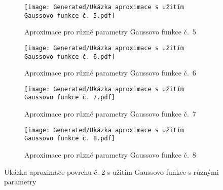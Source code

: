 \begin{landscapeimagepage}
    \vspace*{\fill}
    \begin{figure}[H]
        \centering
        \begin{subfigure}{.5\textheight}
            \centering
            \texttt{[image: Generated/Ukázka aproximace s užitím Gaussovo funkce č. 5.pdf]}
            \caption{Aproximace pro různé parametry Gaussovo funkce č.~5}
            \label{fig:Ukázka aproximace povrchu s užitím Gaussovo funkce č. 5}
        \end{subfigure}
        \vspace{0.5cm}
        \hspace{2.5cm}
        \begin{subfigure}{.5\textheight}
            \centering
            \texttt{[image: Generated/Ukázka aproximace s užitím Gaussovo funkce č. 6.pdf]}
            \caption{Aproximace pro různé parametry Gaussovo funkce č.~6}
            \label{fig:Ukázka aproximace povrchu s užitím Gaussovo funkce č. 6}
        \end{subfigure}
        \vspace{0.5cm}
        \begin{subfigure}{.5\textheight}
            \centering
            \texttt{[image: Generated/Ukázka aproximace s užitím Gaussovo funkce č. 7.pdf]}
            \caption{Aproximace pro různé parametry Gaussovo funkce č.~7}
            \label{fig:Ukázka aproximace povrchu s užitím Gaussovo funkce č. 7}
        \end{subfigure}
        \hspace{2.5cm}
        \begin{subfigure}{.5\textheight}
            \centering
            \texttt{[image: Generated/Ukázka aproximace s užitím Gaussovo funkce č. 8.pdf]}
            \caption{Aproximace pro různé parametry Gaussovo funkce č.~8}
            \label{fig:Ukázka aproximace povrchu s užitím Gaussovo funkce č. 8}
        \end{subfigure}
        \caption{Ukázka aproximace povrchu č. 2 s užitím Gaussovo funkce s různými parametry}
        \label{fig:Ukázka aproximace povrchu č. 2 s užitím Gaussovo funkce s různými parametry}
    \end{figure}
    \vspace*{\fill}
\end{landscapeimagepage}